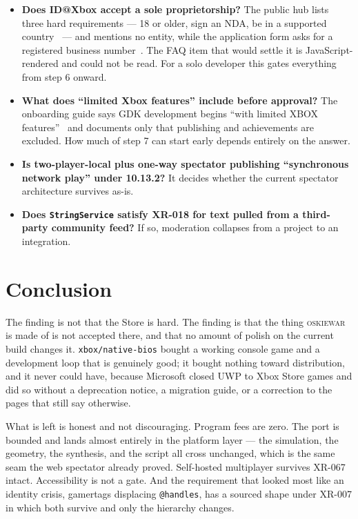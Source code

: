 \documentclass[10pt,letterpaper,twocolumn]{article}
\newcommand{\game}{\textsc{oskiewar}}
\newcommand{\code}[1]{\texttt{#1}}
\begin{document}
\begin{itemize}
  \item \textbf{Does ID@Xbox accept a sole proprietorship?} The public hub lists three hard requirements --- 18 or older, sign an NDA, be in a supported country~\cite{msIdHub} --- and mentions no entity, while the application form asks for a registered business number~\cite{msJoinId}. The FAQ item that would settle it is JavaScript-rendered and could not be read. For a solo developer this gates everything from step 6 onward.
  \item \textbf{What does ``limited Xbox features'' include before approval?} The onboarding guide says GDK development begins ``with limited XBOX features''~\cite{msJoinId} and documents only that publishing and achievements are excluded. How much of step 7 can start early depends entirely on the answer.
  \item \textbf{Is two-player-local plus one-way spectator publishing ``synchronous network play'' under 10.13.2?} It decides whether the current spectator architecture survives as-is.
  \item \textbf{Does \code{StringService} satisfy XR-018 for text pulled from a third-party community feed?} If so, moderation collapses from a project to an integration.
\end{itemize}

\section{Conclusion}

The finding is not that the Store is hard. The finding is that the thing \game{} is made of is not accepted there, and that no amount of polish on the current build changes it. \code{xbox/native-bios} bought a working console game and a development loop that is genuinely good; it bought nothing toward distribution, and it never could have, because Microsoft closed UWP to Xbox Store games and did so without a deprecation notice, a migration guide, or a correction to the pages that still say otherwise.

What is left is honest and not discouraging. Program fees are zero. The port is bounded and lands almost entirely in the platform layer --- the simulation, the geometry, the synthesis, and the script all cross unchanged, which is the same seam the web spectator already proved. Self-hosted multiplayer survives XR-067 intact. Accessibility is not a gate. And the requirement that looked most like an identity crisis, gamertags displacing \code{@handles}, has a sourced shape under XR-007 in which both survive and only the hierarchy changes.
\end{document}
